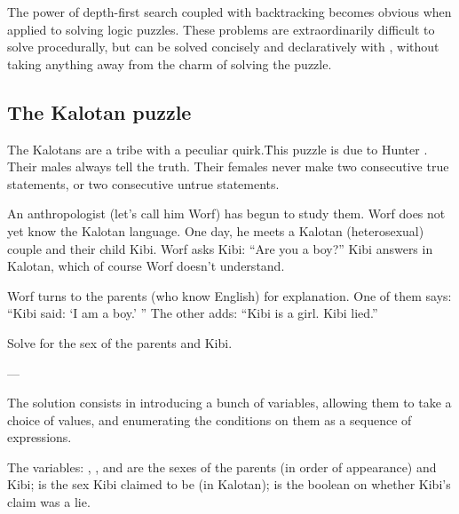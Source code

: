 The power of depth-first search coupled
with backtracking becomes obvious when applied to solving
logic puzzles.  These problems are extraordinarily difficult
to solve procedurally, but can be solved concisely and
declaratively with , without taking anything away
from the charm of solving the puzzle.

\subsection{The Kalotan puzzle}

The Kalotans are a tribe with a peculiar quirk.\f{This
puzzle is due to Hunter \cite{hunter}.}  Their males always
tell the truth.  Their females never make two consecutive
true statements, or two consecutive untrue statements.

An anthropologist (let’s call him Worf) has begun to
study them.  Worf does not yet know the Kalotan
language.  One day, he meets a Kalotan (heterosexual)
couple and their child Kibi.  Worf asks Kibi: “Are you
a boy?”  Kibi answers in Kalotan, which of course Worf
doesn’t understand.

Worf turns to the parents (who know English) for
explanation.  One of them says: “Kibi said: ‘I am a
boy.’ ” The other adds: “Kibi is a girl.  Kibi lied.”

Solve for the sex of the parents and Kibi.

\centerline{—}

The solution consists in introducing a bunch of variables,
allowing them to take a choice of values, and
enumerating the conditions on them as a sequence of
 expressions.

The variables: ,
, and  are the sexes of the parents (in
order of appearance) and Kibi;  is
the sex Kibi claimed to be (in Kalotan); 
is the boolean on whether Kibi’s claim was a lie.


